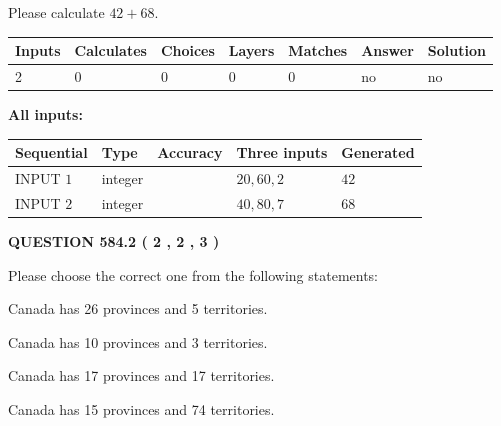 \documentclass[12pt]{article}
\begin{document}
  
 
Please calculate $ %
42 +  %
68 $.
 
 
   
   
   
   
\noindent\begin{tabular}{|l|l|l|l|l|l|l|}
 \hline
Inputs & Calculates & Choices & Layers & Matches & Answer & Solution \\ \hline
 2  & 
 0  & 
 0
  & 
 0  & 
 0  & 
  no & 
  no 
  \\ \hline
 \end{tabular}
   
   
   
   
\noindent{}
   
   
   
   
\noindent\vspace{0.1in}\hspace{-0.08in} {\textbf{\Large{All inputs: }}}
   
   
  
  
\noindent\begin{tabular}{|l|l|l|l|l|}
\hline
 Sequential & Type & Accuracy & Three inputs & Generated \\ 
\hline
 
 
  INPUT $  1 $ & integer &  & $
 20
 , 
 60
 , 
 2
 $ & $ 42 $ 
 \\  \hline  
 
 
  INPUT $  2 $ & integer &  & $
 40
 , 
 80
 , 
 7
 $ & $ 68 $ 
 \\  \hline  
 \end{tabular}
   
   
  
\vspace{0.2in}
  
{\textbf{\Large{QUESTION
584.2 
 ( 2 , 2 , 3 )
}}}
  
  
Please choose the correct one from the following statements:
 
 
Canada has  26 provinces and  5 territories.
 
 
Canada has 10  provinces and 3 territories.
 
 
Canada has  17 provinces and  17 territories.
 
 
Canada has  15 provinces and  74 territories.
 
\end{document}
